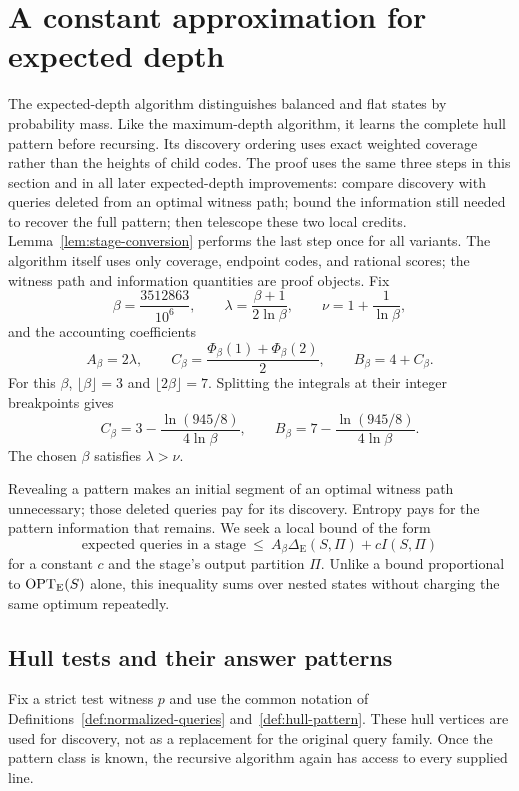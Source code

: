 \section{A constant approximation for expected depth}
\label{sec:mass-improvement}

The expected-depth algorithm distinguishes balanced and flat states
by probability mass. Like the maximum-depth algorithm, it learns
the complete hull pattern before recursing. Its discovery ordering
uses exact weighted coverage rather than the heights of child codes.
The proof uses the same three steps in this section and in all later
expected-depth improvements: compare discovery with queries deleted
from an optimal witness path; bound the information still needed to
recover the full pattern; then telescope these two local credits.
Lemma~\ref{lem:stage-conversion} performs the last step once for all
variants. The algorithm itself uses only coverage, endpoint codes, and
rational scores; the witness path and information quantities are proof
objects.
Fix
\[
 \beta=\frac{3512863}{10^6},\qquad
 \lambda=\frac{\beta+1}{2\ln\beta},\qquad
 \nu=1+\frac1{\ln\beta},
\]
and the accounting coefficients
\[
 A_\beta=2\lambda,\qquad
 C_\beta=\frac{\Phi_\beta(1)+\Phi_\beta(2)}2,\qquad
 B_\beta=4+C_\beta.
\]
For this $\beta$, $\lfloor\beta\rfloor=3$ and
$\lfloor2\beta\rfloor=7$. Splitting the integrals at their integer
breakpoints gives
\[
 C_\beta=3-\frac{\ln(945/8)}{4\ln\beta},\qquad
 B_\beta=7-\frac{\ln(945/8)}{4\ln\beta}.
\]
The chosen $\beta$ satisfies $\lambda>\nu$.

Revealing a pattern makes an initial segment of an optimal witness
path unnecessary; those deleted queries pay for its discovery.
Entropy pays for the pattern information that remains. We seek a
local bound of the form
\[
 \text{expected queries in a stage}
 \ \le\ A_\beta\Delta_{\mathrm E}(S,\Pi)+cI(S,\Pi)
\]
for a constant $c$ and the stage's output partition $\Pi$.
Unlike a bound proportional to $\operatorname{OPT}_{\mathrm E}(S)$ alone, this inequality sums
over nested states without charging the same optimum repeatedly.

\subsection{Hull tests and their answer patterns}

Fix a strict test witness $p$ and use the common notation of
Definitions~\ref{def:normalized-queries} and~\ref{def:hull-pattern}.
These hull vertices are used for discovery, not as a replacement for
the original query family. Once the pattern class is known, the
recursive algorithm again has access to every supplied line.

